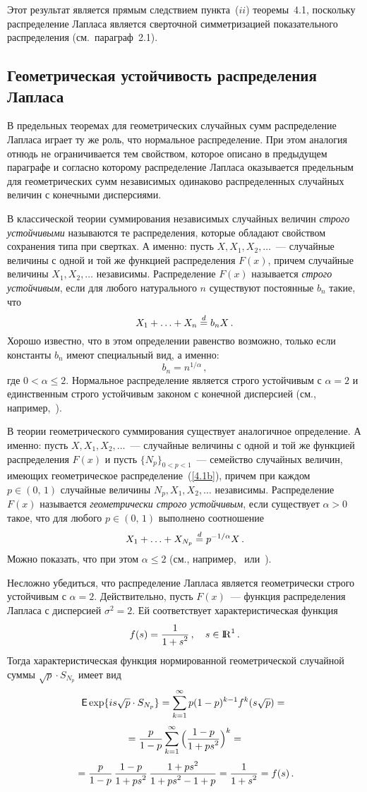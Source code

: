 \begin{multicols}{2}
Этот результат является прямым следствием пункта~($ii$) теоремы~4.1,
поскольку распределение Лапласа является сверточной симметризацией
показательного распределения (см.\ параграф~2.1).

\subsection{Геометрическая устойчивость распределения Лапласа}

В предельных теоремах для геометрических случайных сумм
распределение Лапласа играет ту же роль, что нормальное
распределение. При этом аналогия отнюдь не ограничивается тем
свойством, которое описано в предыдущем параграфе и согласно
которому распределение Лапласа оказывается предельным для
геометрических сумм независимых одинаково распределенных случайных
величин с конечными дисперсиями.

В классической теории суммирования независимых случайных величин
{\it строго устойчивыми} называются те распределения, которые
обладают свойством сохранения типа при свертках. А именно: пусть
$X,X_1,X_2,\ldots$~--- случайные величины с одной и той же функцией
распределения $F(x)$, причем случайные величины $X_1,X_2,\ldots$
независимы. Распределение $F(x)$ называется {\it строго
устойчивым}, если для любого натурального $n$ существуют
постоянные $b_n$ такие, что
$$
X_1+\ldots+X_n\stackrel{d}{=} b_n X\,.
$$
Хорошо известно, что в этом определении равенство возможно, только если
константы $b_n$ имеют специальный вид, а именно:
$$
b_n=n^{1/\alpha}\,,
$$
где $0<\alpha\le 2$. Нормальное распределение
является строго устойчивым с $\alpha=2$ и единственным строго
устойчивым законом с конечной дисперсией (см., например,~\cite{18be}).

В теории геометрического суммирования существует аналогичное
определение. А именно: пусть $X,X_1,X_2,\ldots$~--- случайные
величины с одной и той же функцией распределения $F(x)$ и пусть
$\{N_p\}_{0<p<1}$~--- семейство случайных величин, имеющих
геометрическое распределение~(\ref{4.1b}), причем при каждом $p\in(0,\,1)$
случайные величины $N_p,X_1,X_2,\ldots$ независимы. Распределение
$F(x)$ называется {\it геометрически строго устойчивым}, если
существует $\alpha>0$ такое, что для любого $p\in(0,\,1)$ выполнено
соотношение
$$
X_1+\ldots+X_{N_p}\stackrel{d}{=} p^{-1/\alpha}X\,.
$$
Можно показать, что при этом $\alpha\le2$ (см., например,~\cite{8be}
или~\cite{34be}).

Несложно убедиться, что распределение Лапласа является
геометрически строго устойчивым с $\alpha=2$. Действительно, пусть
$F(x)$~--- функция распределения Лапласа с дисперсией $\sigma^2=2$.
Ей соответствует характеристическая функция
$$
f(s)=\displaystyle\frac{\displaystyle 1\mathstrut}{\displaystyle 1+s^2\mathstrut}\,,\quad s\in {\rm I\hspace{-0.7mm}\rm R}^1\,.
$$
Тогда
характеристическая функция нормированной геометрической случайной
суммы $\sqrt{p}\cdot S_{N_p}$ имеет вид
$$ %
{\sf E}\exp\{is\sqrt{p}\cdot S_{N_p}\}=
\sum_{k=1}^{\infty}p(1-p)^{k-1}f^k(s\sqrt{p})={}
$$
$$
{}=
\displaystyle\frac{\displaystyle p\mathstrut}{\displaystyle 1-p\mathstrut}\sum_{k=1}^{\infty}\Big(\displaystyle\frac{\displaystyle 1-p\mathstrut}{\displaystyle 1+ps^2\mathstrut}\Big)^k= {}
$$
$$
{} =\displaystyle\frac{\displaystyle p\mathstrut}{\displaystyle 1-p\mathstrut}\,\displaystyle\frac{\displaystyle 1-p\mathstrut}{\displaystyle 1+ps^2\mathstrut}\,\displaystyle\frac{\displaystyle 1+ps^2\mathstrut}{\displaystyle 1+ps^2-1+p\mathstrut}=
\displaystyle\frac{\displaystyle 1\mathstrut}{\displaystyle 1+s^2\mathstrut}=f(s)\,.
$$ %


\end{multicols}
